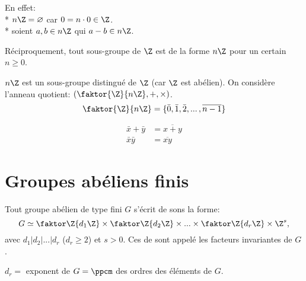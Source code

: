 En effet: \\
* $n\Z=\varnothing$ car $0=n\cdot 0\in\Z$.\\
* soient $a,b\in n\Z$ qui $a-b\in n\Z$. 

Réciproquement, tout sous-groupe de $\Z$ est de la forme $n\Z$ pour un certain $n\geq 0$.

$n\Z$ est un sous-groupe distingué de $\Z$ (car $\Z$ est abélien). On considère l'anneau quotient: $(\faktor{\Z}{n\Z}, +, \times)$.
$$\faktor{\Z}{n\Z}=\{\bar 0,\bar 1, \bar 2, ...\,, \overline{n-1}\}$$

\begin{align}
	\bar x+\bar y &= \overline{x+y}\\
	\bar x \bar y &= \overline{xy}
\end{align}

\section{Groupes abéliens finis}

\begin{theorem}
	Tout groupe abélien de type fini $G$ s'écrit de sons la forme:
	$$G\simeq \faktor\Z{d_1\Z} \times \faktor\Z{d_2\Z} \times ... \times \faktor\Z{d_r\Z} \times \Z^s,$$
	avec $d_1|d_2|...|d_r$ ($d_r\geq 2$) et $s>0$. Ces de sont appelé les facteurs invariantes de $G$.
\end{theorem}
\begin{remark}
	$d_r = $ exponent de $G = \ppcm$ des ordres des éléments de $G$. 
\end{remark}

